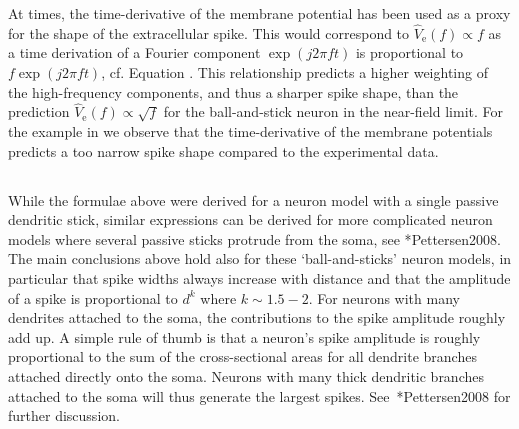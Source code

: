At times, the time-derivative of the membrane potential has been used as a proxy for the shape of the extracellular spike.
This would correspond to  $\hat{V}_\mathrm{e}(f) \propto f$ as a time derivation of a Fourier component   
$\exp (j 2 \pi f t)$  is proportional to $f \exp (j 2 \pi f t)$, cf. Equation . This relationship predicts a higher weighting of
the high-frequency components, and thus a sharper spike shape, than the  prediction $\hat{V}_\mathrm{e}(f) \propto \sqrt{f}$ for the ball-and-stick neuron in the near-field limit.
For the example in  we observe that the time-derivative of the membrane potentials predicts a too narrow
spike shape compared to the experimental data.


\subsection{}
While the formulae above were derived for a neuron model with a single passive dendritic stick, similar expressions can be derived for 
more complicated neuron models where several passive sticks protrude from the soma, see \citeasnoun**{Pettersen2008}.
The main conclusions above hold also for these `ball-and-sticks' neuron models, in particular that spike widths always increase with distance and that
the amplitude of a spike is proportional to $d^{k}$ where $k\sim1.5-2$. For neurons with many dendrites attached to the 
soma, the contributions to the spike amplitude roughly add up. A simple rule of thumb is that a neuron's spike amplitude is 
roughly proportional to the sum of the cross-sectional areas for all dendrite branches attached directly onto the soma. Neurons with many thick dendritic branches attached to the soma will thus generate the largest spikes. See~\citeasnoun**{Pettersen2008} for further discussion.


